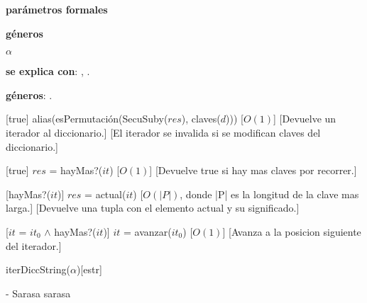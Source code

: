 
\begin{Interfaz}

  \textbf{par\'ametros formales}\parindent\\
  \parbox{1.7cm}{\textbf{g\'eneros}} $\alpha$
 
 
  \textbf{se explica con}: , .

  \textbf{g\'eneros}: .


%
[true]
{alias(esPermutaci\'on(SecuSuby($res$), claves($d$)))}%
[$O(1)$] %
[Devuelve un iterador al diccionario.]
[El iterador se invalida si se modifican claves del diccionario.]

%
[true]
{$res$ = hayMas?($it$)}%
[$O(1)$]
[Devuelve true si hay mas claves por recorrer.]

%
[hayMas?($it$)]
{$res$ = actual($it$)}%
[$O(|P|)$, donde |P| es la longitud de la clave mas larga.]
[Devuelve una tupla con el elemento actual y su significado.]

%
[$it$ = $it_0$ $\land$ hayMas?($it$)]
{$it$ = avanzar($it_0$)}%
[$O(1)$]
[Avanza a la posicion siguiente del iterador.]



\end{Interfaz}

\pagebreak

\begin{Representacion}
  
  
  \begin{Estructura}{iterDiccString($\alpha$)}[estr]
    \begin{Tupla}[estr]
    \end{Tupla}
  \end{Estructura}



- Sarasa sarasa

%
%

\end{Representacion}

